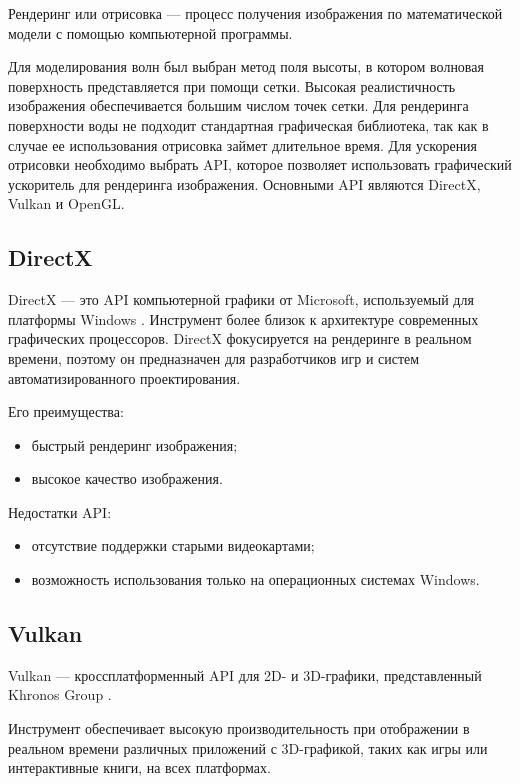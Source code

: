 Рендеринг или отрисовка --- процесс получения изображения по математической модели с помощью компьютерной программы.

Для моделирования волн был выбран метод поля высоты, в котором волновая поверхность представляется при помощи сетки. Высокая реалистичность изображения обеспечивается большим числом точек сетки. Для рендеринга поверхности воды не подходит стандартная графическая библиотека, так как в случае ее использования отрисовка займет длительное время. Для ускорения отрисовки необходимо выбрать API, которое позволяет использовать графический ускоритель для рендеринга изображения. Основными API являются DirectX, Vulkan и OpenGL.

\subsection{DirectX}

DirectX --- это API компьютерной графики от Microsoft, используемый для платформы Windows \cite{directx}. Инструмент более близок к архитектуре современных графических процессоров. DirectX фокусируется на рендеринге в реальном времени, поэтому он предназначен для разработчиков игр и систем автоматизированного проектирования.

Его преимущества:

\begin{itemize}
	\item быстрый рендеринг изображения;
	\item высокое качество изображения.
\end{itemize}

Недостатки API:

\begin{itemize}
	\item отсутствие поддержки старыми видеокартами;
	\item возможность использования только на операционных системах Windows.
\end{itemize}

\subsection{Vulkan}

Vulkan --- кроссплатформенный API для 2D- и 3D-графики, представленный Khronos Group \cite{vulkan}.

Инструмент обеспечивает высокую производительность при отображении в реальном времени различных приложений с 3D-графикой, таких как игры или интерактивные книги, на всех платформах.

